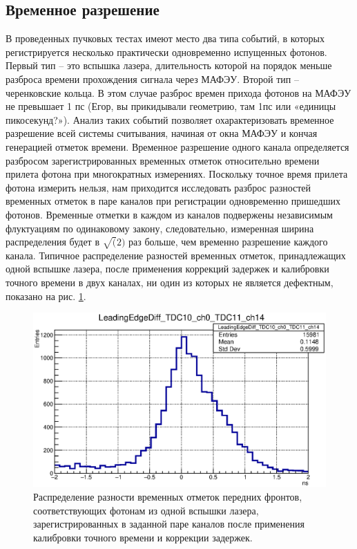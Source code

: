 \subsection{Временное разрешение}

В проведенных пучковых тестах имеют место два типа событий, в которых регистрируется несколько практически одновременно испущенных фотонов. Первый тип – это вспышка лазера, длительность которой на порядок меньше разброса времени прохождения сигнала через МАФЭУ. Второй тип – черенковские кольца. В этом случае разброс времен прихода фотонов на МАФЭУ не превышает 1 пс (Егор, вы прикидывали геометрию, там 1пс или «единицы пикосекунд?»). Анализ таких событий позволяет охарактеризовать временное разрешение всей системы считывания, начиная от окна МАФЭУ и кончая генерацией отметок времени. Временное разрешение одного канала определяется разбросом зарегистрированных временных отметок относительно времени прилета фотона при многократных измерениях. Поскольку точное время прилета фотона измерить нельзя, нам приходится исследовать разброс разностей временных отметок в паре каналов при регистрации одновременно пришедших фотонов. Временные отметки в каждом из каналов подвержены независимым флуктуациям по одинаковому закону, следовательно, измеренная ширина распределения будет в $ \sqrt(2) $ раз больше, чем временно разрешение каждого канала. Типичное распределение разностей временных отметок, принадлежащих одной вспышке лазера, после применения коррекций задержек и калибровки точного времени в двух каналах, ни один из которых не является дефектным, показано на рис. \ref{fig:TimeRes}.

\begin{figure}
\includegraphics[width=1.0\textwidth]{pictures/LeadingEdgeDiff_TDC10_ch0_TDC11_ch14_corr.eps}
\caption{Распределение разности временных отметок передних фронтов, соответствующих фотонам из одной вспышки лазера, зарегистрированных в заданной паре каналов после применения калибровки точного времени и коррекции задержек.}
\label{fig:TimeRes}
\end{figure}

